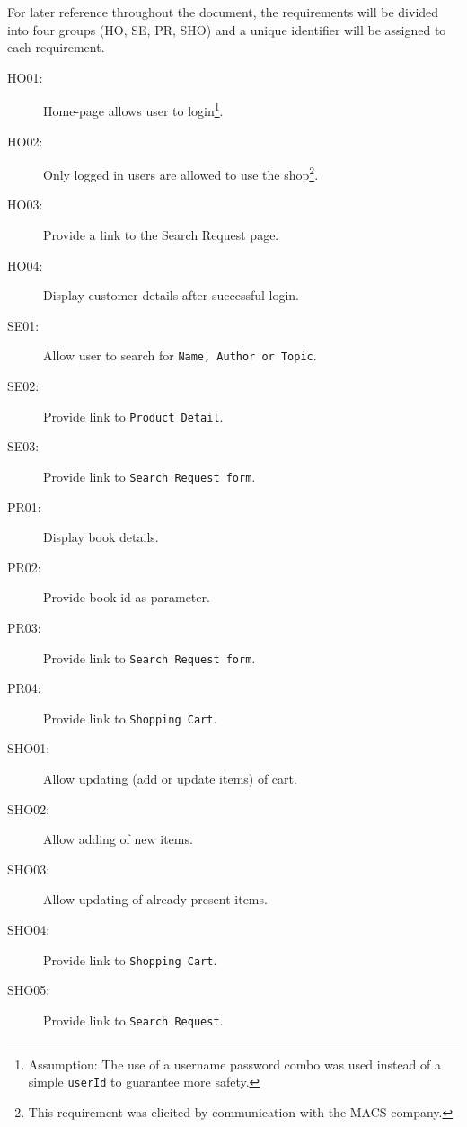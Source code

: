 For later reference throughout the document, the requirements will be divided into four groups (\ac{HO}, \ac{SE}, \ac{PR}, \ac{SHO}) and a unique identifier will be assigned to each requirement.

\begin{description}
\item[HO01:] Home-page allows user to login\footnote{Assumption: The use of a username password combo was used instead of a simple \texttt{userId} to guarantee more safety.}.
\item[HO02:] Only logged in users are allowed to use the shop\footnote{This requirement was elicited by communication with the MACS company.}.
\item[HO03:] Provide a link to the Search Request page.
\item[HO04:] Display customer details after successful login.
\item[SE01:] Allow user to search for \texttt{Name, Author or Topic}.
\item[SE02:] Provide link to \texttt{Product Detail}.
\item[SE03:] Provide link to \texttt{Search Request form}.
\item[PR01:] Display book details.
\item[PR02:] Provide book id as parameter.
\item[PR03:] Provide link to \texttt{Search Request form}.
\item[PR04:] Provide link to \texttt{Shopping Cart}.
\item[SHO01:] Allow updating (add or update items) of cart.
\item[SHO02:] Allow adding of new items.
\item[SHO03:] Allow updating of already present items.
\item[SHO04:] Provide link to \texttt{Shopping Cart}.
\item[SHO05:] Provide link to \texttt{Search Request}.
\end{description}